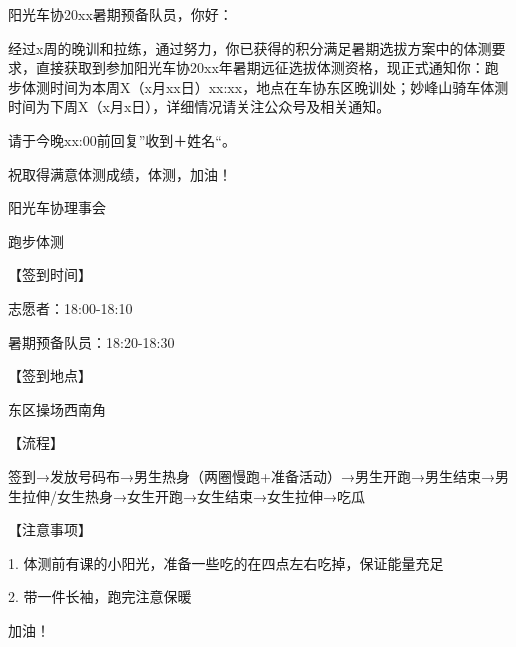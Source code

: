 \documentclass{ctexbook}
\begin{document}
\begin{center}
    \begin{tcolorbox}[title=新生见面会短信,text width = 0.8\linewidth]
    \end{tcolorbox}
\end{center}

\begin{center}
    \begin{tcolorbox}[title=体测通知,text width = 0.8\linewidth]
    \end{tcolorbox}
\end{center}

\begin{center}
    \begin{tcolorbox}[title=成队通知,text width = 0.8\linewidth]
    \end{tcolorbox}
\end{center}
\begin{center}
\begin{tcolorbox}[title=暑期跑步体测短信模板]
    
    阳光车协20xx暑期预备队员，你好：
    
    经过x周的晚训和拉练，通过努力，你已获得的积分满足暑期选拔方案中的体测要求，直接获取到参加阳光车协20xx年暑期远征选拔体测资格，现正式通知你：跑步体测时间为本周X（x月xx日）xx:xx，地点在车协东区晚训处；妙峰山骑车体测时间为下周X（x月x日），详细情况请关注公众号及相关通知。
    
    请于今晚xx:00前回复''收到＋姓名``。
    
    祝取得满意体测成绩，体测，加油！
    
    阳光车协理事会
    \end{tcolorbox}
\end{center}
\begin{center}
    \begin{tcolorbox}
    
        跑步体测
        
        【签到时间】
        
        志愿者：18:00-18:10
        
        暑期预备队员：18:20-18:30
        
        【签到地点】
        
        东区操场西南角
        
        【流程】
        
        签到→发放号码布→男生热身（两圈慢跑+准备活动）→男生开跑→男生结束→男生拉伸/女生热身→女生开跑→女生结束→女生拉伸→吃瓜
        
        【注意事项】
        
        1. 体测前有课的小阳光，准备一些吃的在四点左右吃掉，保证能量充足
        
        2. 带一件长袖，跑完注意保暖
        
        加油！
        \end{tcolorbox} 
\end{center}
\end{document}
